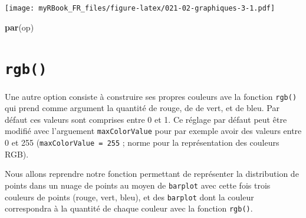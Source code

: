\documentclass[
]{book}
\newenvironment{Shaded}{\begin{snugshade}}{\end{snugshade}}
\newcommand{\KeywordTok}[1]{\textcolor[rgb]{0.13,0.29,0.53}{\textbf{#1}}}
\newcommand{\NormalTok}[1]{#1}
\begin{document}
\texttt{[image: myRBook\_FR\_files/figure-latex/021-02-graphiques-3-1.pdf]}

\begin{Shaded}
\begin{Highlighting}[]
\KeywordTok{par}\NormalTok{(op)}
\end{Highlighting}
\end{Shaded}

\hypertarget{rgb}{%
\section{\texorpdfstring{\texttt{rgb()}}{rgb()}}\label{rgb}}

Une autre option consiste à construire ses propres couleurs ave la fonction \texttt{rgb()} qui prend comme argument la quantité de rouge, de de vert, et de bleu. Par défaut ces valeurs sont comprises entre 0 et 1. Ce réglage par défaut peut être modifié avec l'arguement \texttt{maxColorValue} pour par exemple avoir des valeurs entre 0 et 255 (\texttt{maxColorValue\ =\ 255} ; norme pour la représentation des couleurs RGB).

Nous allons reprendre notre fonction permettant de représenter la distribution de points dans un nuage de points au moyen de \texttt{barplot} avec cette fois trois couleurs de points (rouge, vert, bleu), et des \texttt{barplot} dont la couleur correspondra à la quantité de chaque couleur avec la fonction \texttt{rgb()}.
\end{document}
